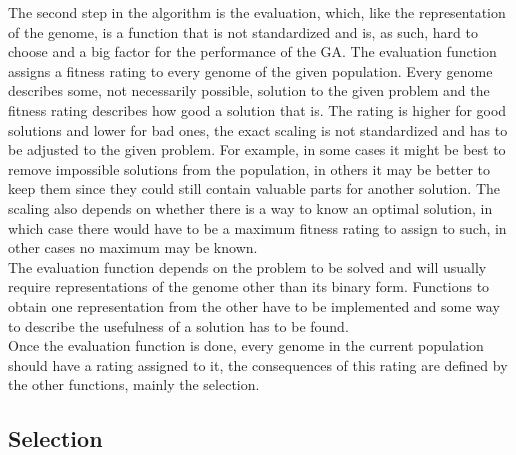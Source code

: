 The second step in the algorithm is the evaluation, which, like the representation of the genome, is a function that is not standardized and is, as such, hard to choose and a big factor for the performance of the GA. The evaluation function assigns a fitness rating to every genome of the given population. Every genome describes some, not necessarily possible, solution to the given problem and the fitness rating describes how good a solution that is. The rating is higher for good solutions and lower for bad ones, the exact scaling is not standardized and has to be adjusted to the given problem. For example, in some cases it might be best to remove impossible solutions from the population, in others it may be better to keep them since they could still contain valuable parts for another solution. The scaling also depends on whether there is a way to know an optimal solution, in which case there would have to be a maximum fitness rating to assign to such, in other cases no maximum may be known. \\
The evaluation function depends on the problem to be solved and will usually require representations of the genome other than its binary form. Functions to obtain one representation from the other have to be implemented and some way to describe the usefulness of a solution has to be found. \\
Once the evaluation function is done, every genome in the current population should have a rating assigned to it, the consequences of this rating are defined by the other functions, mainly the selection.

\subsection{Selection}
\label{sec:selection}

